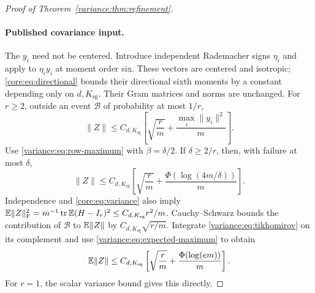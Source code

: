 \documentclass[11pt,a4paper]{article}
\theoremstyle{definition}\newtheorem{definition}[theorem]{Definition}
\theoremstyle{remark}\newtheorem{remark}[theorem]{Remark}
\numberwithin{equation}{section}
\newcommand{\Ksg}{{K_{\mathrm{sg}}}}\newcommand{\Cfour}{{C_4}}
\newcommand{\norm}[1]{\lVert#1\rVert}\newcommand{\ip}[2]{\langle#1,#2\rangle}
\DeclareMathOperator{\tr}{tr}\DeclareMathOperator{\rank}{rank}
\begin{document}
\begin{proof}[Proof of Theorem~\ref{variance:thm:refinement}]
\paragraph{Published covariance input.}
The $y_i$ need not be centered. Introduce independent Rademacher signs
$\eta_i$ and apply \cite[Corollary~2]{Tikhomirov2018} to $\eta_i y_i$
at moment order six. These vectors are centered and isotropic;
\eqref{core:eq:directional} bounds their directional sixth moments by a
constant depending only on $d,\Ksg$. Their Gram matrices and norms are
unchanged. For $r\ge2$, outside an event $\mathcal B$ of probability at most $1/r$,
\begin{equation}\label{variance:eq:tikhomirov}
 \norm Z\le C_{d,\Ksg}\left[\sqrt{\frac rm}
                   +\frac{\max_i\norm{y_i}^2}{m}\right].
\end{equation}
Use \eqref{variance:eq:row-maximum} with $\beta=\delta/2$. If $\delta\ge2/r$,
then, with failure at most $\delta$,
\begin{equation}\label{variance:eq:moderate-implicit}
 \norm Z\le C_{d,\Ksg}\left[\sqrt{\frac rm}
                   +\frac{\Phi(\log(4m/\delta))}{m}\right].
\end{equation}
Independence and \eqref{core:eq:variance} also imply
$\E\norm Z_{\F}^2=m^{-1}\tr\E(H-I_r)^2\le C_{d,\Ksg}r^2/m$.
Cauchy--Schwarz bounds the contribution of $\mathcal B$ to $\E\norm Z$
by $C_{d,\Ksg}\sqrt{r/m}$. Integrate
\eqref{variance:eq:tikhomirov} on its complement and use
\eqref{variance:eq:expected-maximum} to obtain
\begin{equation}\label{variance:eq:expectation}
 \E\norm Z\le C_{d,\Ksg}\left[\sqrt{\frac rm}
                   +\frac{\Phi(\log(em))}{m}\right].
\end{equation}
For $r=1$, the scalar variance bound gives this directly.


\end{proof}
\end{document}
